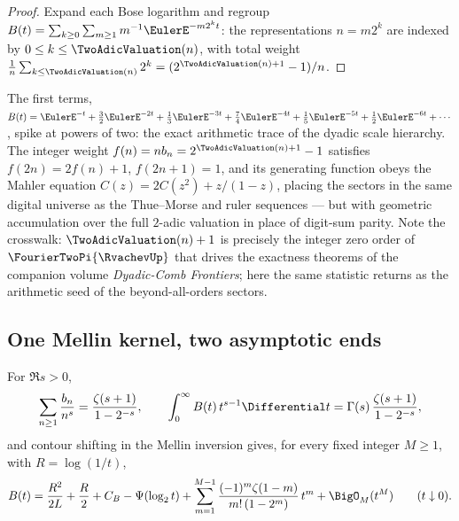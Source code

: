 \begin{proof}
Expand each Bose logarithm and regroup
$B(t)=\sum_{k\ge0}\sum_{m\ge1}m^{-1}\EulerE^{-m2^{k}t}$: the
representations $n=m2^{k}$ are indexed by $0\le k\le\TwoAdicValuation(n)$, with
total weight
$\tfrac1n\sum_{k\le\TwoAdicValuation(n)}2^{k}=(2^{\TwoAdicValuation(n)+1}-1)/n$.
\end{proof}

The first terms,
$B(t)=\EulerE^{-t}+\tfrac32\EulerE^{-2t}+\tfrac13\EulerE^{-3t}
+\tfrac74\EulerE^{-4t}+\tfrac15\EulerE^{-5t}+\tfrac12\EulerE^{-6t}+\cdots$, spike at
powers of two: the exact arithmetic trace of the dyadic scale
hierarchy.  The integer weight $f(n)=nb_n=2^{\TwoAdicValuation(n)+1}-1$
satisfies $f(2n)=2f(n)+1$, $f(2n+1)=1$, and its generating function
obeys the Mahler equation $C(z)=2C(z^{2})+z/(1-z)$, placing the
sectors in the same digital universe as the Thue--Morse and ruler
sequences --- but with geometric accumulation over the full
$2$-adic valuation in place of digit-sum parity.  Note the
crosswalk: $\TwoAdicValuation(n)+1$ is precisely the integer zero order of
$\FourierTwoPi{\RvachevUp}$ that drives the exactness theorems of the companion
volume \emph{Dyadic-Comb Frontiers}; here the same statistic returns
as the arithmetic seed of the beyond-all-orders sectors.

\subsection{One Mellin kernel, two asymptotic ends}

\begin{theorem}
\label{ao:thm:mellin-bridge}
For $\Re s>0$,
\begin{equation}
 \sum_{n\ge1}\frac{b_n}{n^{s}}
 =\frac{\zeta(s+1)}{1-2^{-s}},
 \qquad
 \int_0^\infty B(t)\,t^{s-1}\Differential t
 =\Gamma(s)\,\frac{\zeta(s+1)}{1-2^{-s}},
 \label{ao:eq:mellin}
\end{equation}
and contour shifting in the Mellin inversion gives, for every fixed integer
$M\ge1$, with $R=\log(1/t)$,
\begin{equation}
 B(t)=\frac{R^{2}}{2L}+\frac R2+\CB-\Psi(\log_2t)
 +\sum_{m=1}^{M-1}\frac{(-1)^{m}\zeta(1-m)}{m!\,(1-2^{m})}\,t^{m}
 +\BigO_M(t^{M})
 \qquad(t\downarrow0).
 \label{ao:eq:B-small-t}
\end{equation}
\end{theorem}

